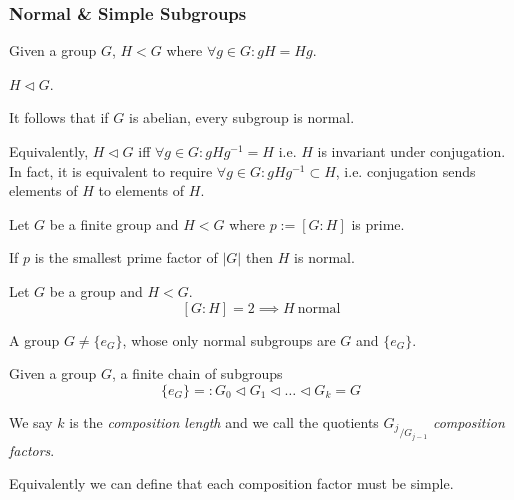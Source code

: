 \subsubsection{Normal \& Simple Subgroups}
\begin{definition}
   Given a group \(G\), \(H < G\) where \(\forall g \in G: gH = Hg\).
\end{definition}
\begin{remark}[Notation]
   \(H \triangleleft G\).
\end{remark}
\begin{remark}
   It follows that if \(G\) is abelian, every subgroup is normal.
\end{remark}
\begin{remark}
   Equivalently, \(H \triangleleft G\) iff \(\forall g \in G: gHg^{-1} = H\) i.e. \(H\) is invariant under conjugation.
   In fact, it is equivalent to require \(\forall g \in G: gHg^{-1} \subset H\), i.e. conjugation sends elements of \(H\) to elements of \(H\).
\end{remark}

\begin{proposition}
   Let \(G\) be a finite group and \(H < G\) where \(p := [G:H]\) is prime.

   If \(p\) is the smallest prime factor of \(|G|\) then \(H\) is normal.
\end{proposition}

\begin{proposition}
   Let \(G\) be a group and \(H < G\).
   \[[G:H] = 2 \implies H~\text{normal}\]
\end{proposition}

\begin{definition}
   A group \(G \neq \{e_G\}\), whose only normal subgroups are \(G\) and \(\{e_G\}\).
\end{definition}

\begin{definition}
   Given a group \(G\), a finite chain of subgroups
   \[\{e_G\} =: G_0 \triangleleft G_1 \triangleleft \ldots \triangleleft G_k = G\]
\end{definition}
\begin{remark}[Terminology]
   We say \(k\) is the \emph{composition length} and we call the quotients \({G_j}_{/G_{j-1}}\) \emph{composition factors}.
\end{remark}
\begin{remark}
   Equivalently we can define that each composition factor must be simple.
\end{remark}

